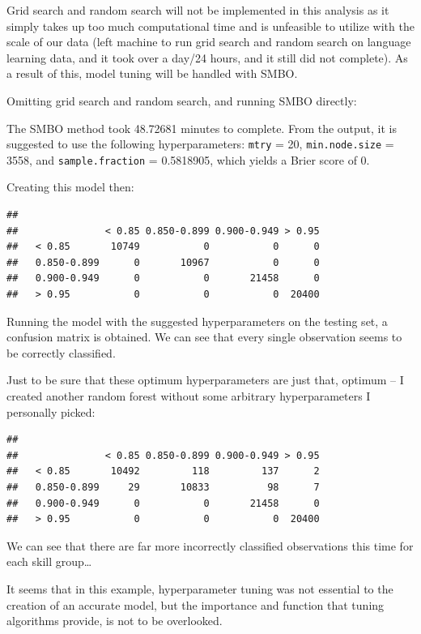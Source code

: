 \documentclass[12pt]{article}
\begin{document}
Grid search and random search will not be implemented in this analysis
as it simply takes up too much computational time and is unfeasible to
utilize with the scale of our data (left machine to run grid search and
random search on language learning data, and it took over a day/24
hours, and it still did not complete). As a result of this, model tuning
will be handled with SMBO.

Omitting grid search and random search, and running SMBO directly:

The SMBO method took 48.72681 minutes to complete. From the output, it
is suggested to use the following hyperparameters: \texttt{mtry} = 20,
\texttt{min.node.size} = 3558, and \texttt{sample.fraction} = 0.5818905,
which yields a Brier score of 0.

\newpage

Creating this model then:

\begin{verbatim}
##              
##               < 0.85 0.850-0.899 0.900-0.949 > 0.95
##   < 0.85       10749           0           0      0
##   0.850-0.899      0       10967           0      0
##   0.900-0.949      0           0       21458      0
##   > 0.95           0           0           0  20400
\end{verbatim}

Running the model with the suggested hyperparameters on the testing set,
a confusion matrix is obtained. We can see that every single observation
seems to be correctly classified.

Just to be sure that these optimum hyperparameters are just that,
optimum -- I created another random forest without some arbitrary
hyperparameters I personally picked:

\begin{verbatim}
##              
##               < 0.85 0.850-0.899 0.900-0.949 > 0.95
##   < 0.85       10492         118         137      2
##   0.850-0.899     29       10833          98      7
##   0.900-0.949      0           0       21458      0
##   > 0.95           0           0           0  20400
\end{verbatim}

We can see that there are far more incorrectly classified observations
this time for each skill group\ldots{}

It seems that in this example, hyperparameter tuning was not essential
to the creation of an accurate model, but the importance and function
that tuning algorithms provide, is not to be overlooked.
\end{document}
